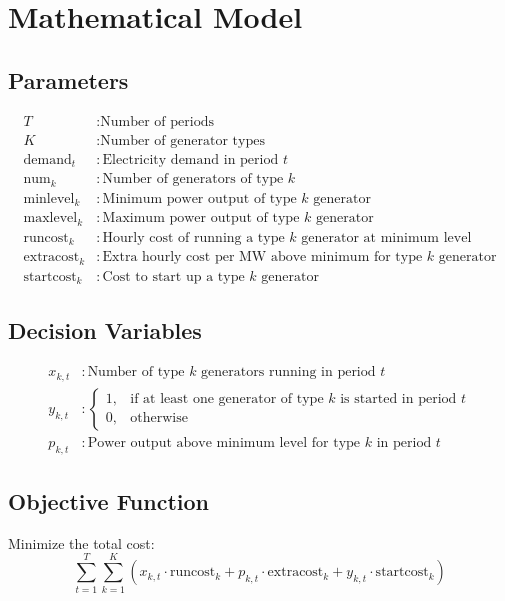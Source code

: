 \documentclass{article}
\begin{document}
\section*{Mathematical Model}

\subsection*{Parameters}
\begin{align*}
T & : \text{Number of periods} \\
K & : \text{Number of generator types} \\
\text{demand}_t & : \text{Electricity demand in period } t \\
\text{num}_k & : \text{Number of generators of type } k \\
\text{minlevel}_k & : \text{Minimum power output of type } k \text{ generator} \\
\text{maxlevel}_k & : \text{Maximum power output of type } k \text{ generator} \\
\text{runcost}_k & : \text{Hourly cost of running a type } k \text{ generator at minimum level} \\
\text{extracost}_k & : \text{Extra hourly cost per MW above minimum for type } k \text{ generator} \\
\text{startcost}_k & : \text{Cost to start up a type } k \text{ generator}
\end{align*}

\subsection*{Decision Variables}
\begin{align*}
x_{k, t} & : \text{Number of type } k \text{ generators running in period } t \\
y_{k, t} & : \begin{cases} 
1, & \text{if at least one generator of type } k \text{ is started in period } t \\
0, & \text{otherwise}
\end{cases} \\
p_{k, t} & : \text{Power output above minimum level for type } k \text{ in period } t
\end{align*}

\subsection*{Objective Function}
Minimize the total cost:
\[
\sum_{t=1}^{T} \sum_{k=1}^{K} \left( x_{k, t} \cdot \text{runcost}_k + p_{k, t} \cdot \text{extracost}_k + y_{k, t} \cdot \text{startcost}_k \right)
\]
\end{document}
